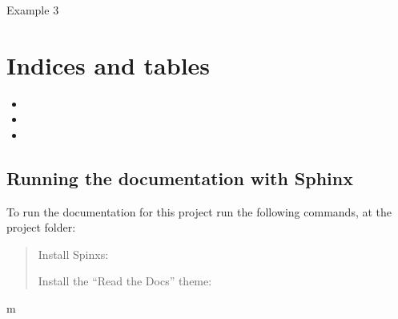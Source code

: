 \documentclass[letterpaper,10pt,english]{sphinxmanual}
\begin{document}

\begin{fulllineitems}
\label{\detokenize{rst/MatrixManipulation:MatrixManipulation.main}}
Example 3

\end{fulllineitems}



\chapter{Indices and tables}
\label{\detokenize{index:indices-and-tables}}\begin{itemize}
\item {} 

\item {} 

\item {} 

\end{itemize}


\section{Running the documentation with Sphinx}
\label{\detokenize{index:running-the-documentation-with-sphinx}}
To run the documentation for this project run the following commands, at the project folder:
\begin{quote}

Install Spinxs:


Install the “Read the Docs” theme:



\end{quote}


\renewcommand{\indexname}{Python Module Index}
\begin{sphinxtheindex}
\def\bigletter#1{{\Large\sffamily#1}\nopagebreak\vspace{1mm}}
\bigletter{m}
\item {}
\end{sphinxtheindex}

\renewcommand{\indexname}{Index}
\printindex
\end{document}
